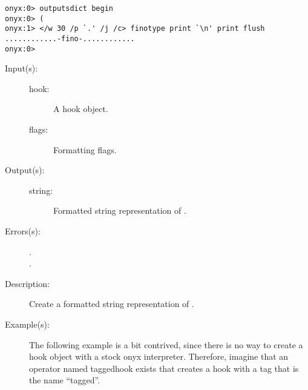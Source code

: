 \begin{description}
\begin{description}
\begin{verbatim}
onyx:0> outputsdict begin
onyx:0> (
onyx:1> </w 30 /p `.' /j /c> finotype print `\n' print flush
............-fino-............
onyx:0>
		\end{verbatim}
	\end{description}
\label{outputsdict:hooktype}
\item[{\onyxop{hook flags}{hooktype}{string}}: ]
	\begin{description}\item[]
	\item[Input(s): ]
		\begin{description}\item[]
		\item[hook: ]
			A hook object.
		\item[flags: ]
			Formatting flags.
		\end{description}
	\item[Output(s): ]
		\begin{description}\item[]
		\item[string: ]
			Formatted string representation of .
		\end{description}
	\item[Errors(s): ]
		\begin{description}\item[]
		\item[.]
		\item[.]
		\end{description}
	\item[Description: ]
		Create a formatted string representation of .
	\item[Example(s): ]
		The following example is a bit contrived, since there is no way
		to create a hook object with a stock onyx interpreter.
		Therefore, imagine that an operator named taggedhook exists that
		creates a hook with a tag that is the name ``tagged''.
		\begin{verbatim}


\end{verbatim}
\end{description}
\end{description}
